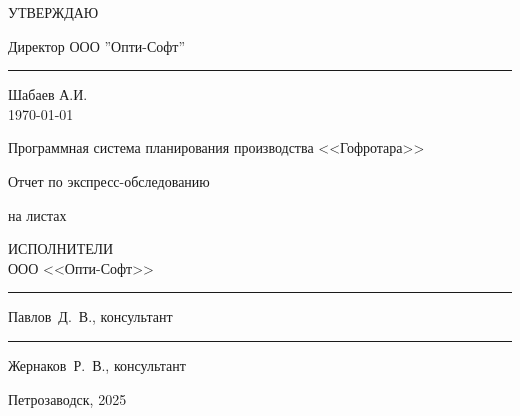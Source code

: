 

\thispagestyle{empty}
%
%
\begin{flushright}
УТВЕРЖДАЮ

\vspace{5mm}
Директор ООО ''Опти-Софт''\\
\vspace{5mm}
\rule{3cm}{0.4pt} Шабаев А.И.\\
\vspace{5mm}
\today
\end{flushright}

\vspace{3cm}
\centerline{\large Программная система планирования производства <<Гофротара>>}


\vspace{5mm}
\centerline{\large \FIRMA}

\vspace{5mm}
\centerline{\large Отчет по экспресс-обследованию}

\vspace{5mm}
\centerline{\ESKDNUM}


\vspace{5mm}
\centerline{на \pageref{LastPage} листах}


\vspace{3cm}
\begin{flushright}
ИСПОЛНИТЕЛИ\\
\vspace{3mm}
ООО <<Опти-Софт>>\\
\vspace{3mm}
\rule{4cm}{0.4pt} Павлов~Д.~В., консультант\\
\vspace{3mm}
\rule{4cm}{0.4pt} Жернаков~Р.~В., консультант\\
\end{flushright}




\vspace{14mm}
\centerline{Петрозаводск, 2025}



\newpage
